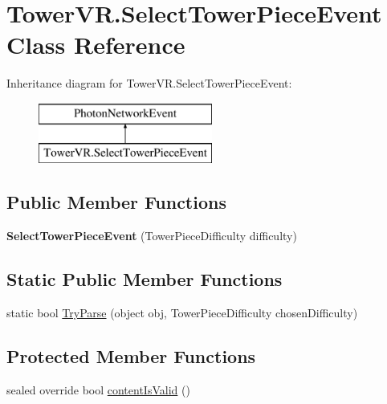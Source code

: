 \hypertarget{class_tower_v_r_1_1_select_tower_piece_event}{}\section{Tower\+V\+R.\+Select\+Tower\+Piece\+Event Class Reference}
\label{class_tower_v_r_1_1_select_tower_piece_event}
Inheritance diagram for Tower\+V\+R.\+Select\+Tower\+Piece\+Event\+:\begin{figure}[H]
\begin{center}
\leavevmode
\includegraphics[height=2.000000cm]{class_tower_v_r_1_1_select_tower_piece_event}
\end{center}
\end{figure}
\subsection*{Public Member Functions}
\begin{DoxyCompactItemize}
\item 
{\bfseries Select\+Tower\+Piece\+Event} (Tower\+Piece\+Difficulty difficulty)\hypertarget{class_tower_v_r_1_1_select_tower_piece_event_ad7b86d65e0cd2538fa04f8a23f53ba4a}{}\label{class_tower_v_r_1_1_select_tower_piece_event_ad7b86d65e0cd2538fa04f8a23f53ba4a}

\end{DoxyCompactItemize}
\subsection*{Static Public Member Functions}
\begin{DoxyCompactItemize}
\item 
static bool \hyperlink{class_tower_v_r_1_1_select_tower_piece_event_a104d8aa0fbb14ffc2be371814e18de0c}{Try\+Parse} (object obj, Tower\+Piece\+Difficulty chosen\+Difficulty)
\end{DoxyCompactItemize}
\subsection*{Protected Member Functions}
\begin{DoxyCompactItemize}
\item 
sealed override bool \hyperlink{class_tower_v_r_1_1_select_tower_piece_event_addf1cb68acf541e199df157a32ab25ca}{content\+Is\+Valid} ()
\end{DoxyCompactItemize}
